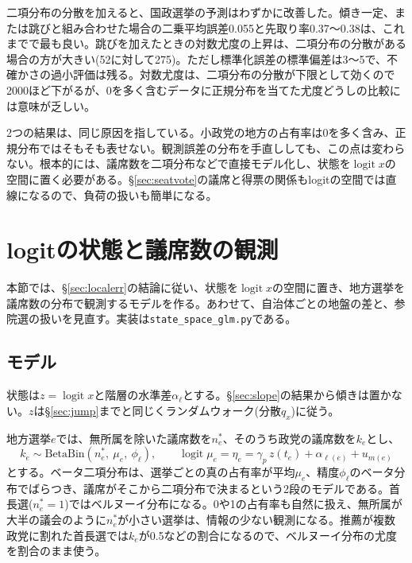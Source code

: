 \documentclass[a4paper,11pt]{ltjsarticle}
\begin{document}
二項分布の分散を加えると、国政選挙の予測はわずかに改善した。傾き一定、または跳びと組み合わせた場合の二乗平均誤差0.055と先取り率0.37〜0.38は、これまでで最も良い。跳びを加えたときの対数尤度の上昇は、二項分布の分散がある場合の方が大きい(52に対して275)。ただし標準化誤差の標準偏差は3〜5で、不確かさの過小評価は残る。対数尤度は、二項分布の分散が下限として効くので2000ほど下がるが、0を多く含むデータに正規分布を当てた尤度どうしの比較には意味が乏しい。

2つの結果は、同じ原因を指している。小政党の地方の占有率は0を多く含み、正規分布ではそもそも表せない。観測誤差の分布を手直ししても、この点は変わらない。根本的には、議席数を二項分布などで直接モデル化し、状態を$\operatorname{logit}x$の空間に置く必要がある。\S\ref{sec:seatvote}の議席と得票の関係もlogitの空間では直線になるので、負荷の扱いも簡単になる。

\section{logitの状態と議席数の観測}
\label{sec:glm}

本節では、\S\ref{sec:localerr}の結論に従い、状態を$\operatorname{logit}x$の空間に置き、地方選挙を議席数の分布で観測するモデルを作る。あわせて、自治体ごとの地盤の差と、参院選の扱いを見直す。実装は\texttt{state\_space\_glm.py}である。

\subsection{モデル}

状態は$z=\operatorname{logit}x$と階層の水準差$\alpha_\ell$とする。\S\ref{sec:slope}の結果から傾きは置かない。$z$は\S\ref{sec:jump}までと同じくランダムウォーク(分散$q_x$)に従う。

地方選挙$e$では、無所属を除いた議席数を$n^\ast_e$、そのうち政党の議席数を$k_e$とし、
\begin{equation}
  k_e \sim \text{BetaBin}(n^\ast_e,\ \mu_e,\ \phi_\ell),\qquad
  \operatorname{logit}\mu_e = \eta_e = \gamma_p\,z(t_e) + \alpha_{\ell(e)} + u_{m(e)}
  \label{eq:glmobs}
\end{equation}
とする。ベータ二項分布は、選挙ごとの真の占有率が平均$\mu_e$、精度$\phi_\ell$のベータ分布でばらつき、議席がそこから二項分布で決まるという2段のモデルである。首長選($n^\ast_e=1$)ではベルヌーイ分布になる。0や1の占有率も自然に扱え、無所属が大半の議会のように$n^\ast_e$が小さい選挙は、情報の少ない観測になる。推薦が複数政党に割れた首長選では$k_e$が0.5などの割合になるので、ベルヌーイ分布の尤度を割合のまま使う。
\end{document}
